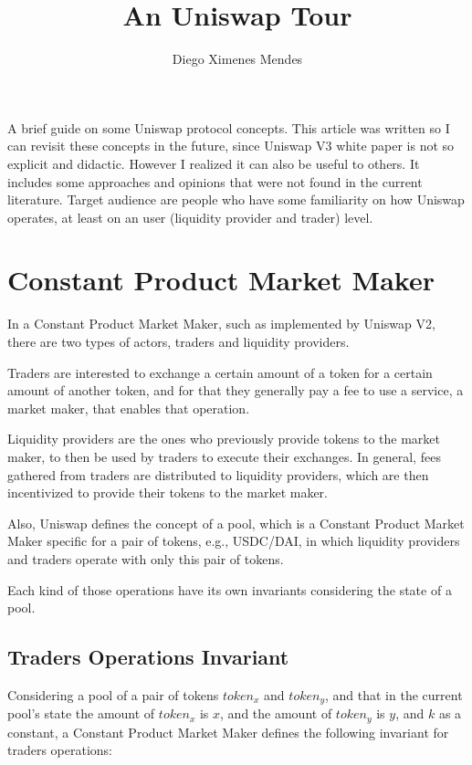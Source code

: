 \documentclass{article}
\title{An Uniswap Tour}
\author{Diego Ximenes Mendes}
\begin{document}
\date{}
\maketitle

A brief guide on some Uniswap protocol concepts.
This article was written so I can revisit these concepts in the future, since Uniswap V3 white paper is not so explicit and didactic.
However I realized it can also be useful to others.
It includes some approaches and opinions that were not found in the current literature.
Target audience are people who have some familiarity on how Uniswap operates, at least on an user (liquidity provider and trader) level.

\section{Constant Product Market Maker}

In a Constant Product Market Maker, such as implemented by Uniswap V2, there are two types of actors, traders and liquidity providers.

Traders are interested to exchange a certain amount of a token for a certain amount of another token, and for that they generally pay a fee to use a service, a market maker, that enables that operation.

Liquidity providers are the ones who previously provide tokens to the market maker, to then be used by traders to execute their exchanges.
In general, fees gathered from traders are distributed to liquidity providers, which are then incentivized to provide their tokens to the market maker.

Also, Uniswap defines the concept of a pool, which is a Constant Product Market Maker specific for a pair of tokens, e.g., USDC/DAI, in which liquidity providers and traders operate with only this pair of tokens.

Each kind of those operations have its own invariants considering the state of a pool.

\subsection{Traders Operations Invariant}
\label{section:traders_invariant}

Considering a pool of a pair of tokens $token_x$ and $token_y$, and that in the current pool's state the amount of $token_x$ is $x$, and the amount of $token_y$ is $y$, and $k$ as a constant, a Constant Product Market Maker defines the following invariant for traders operations:
\end{document}
